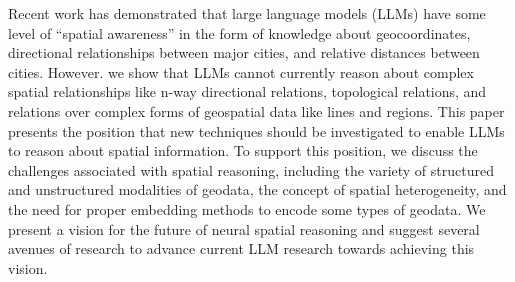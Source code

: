 
Recent work has demonstrated that large language models (LLMs) have some level of ``spatial awareness'' in the form of knowledge about geocoordinates, directional relationships between major cities, and relative distances between cities.
%
However. we show that LLMs cannot currently reason about complex spatial relationships like n-way directional relations, topological relations, and relations over complex forms of geospatial data like lines and regions.
%
This paper presents the position that new techniques should be investigated to enable LLMs to reason about spatial information.
%
To support this position, we discuss the challenges associated with spatial reasoning, including the variety of structured and unstructured modalities of geodata, the concept of spatial heterogeneity, and the need for proper embedding methods to encode some types of geodata.
%
We present a vision for the future of neural spatial reasoning and suggest several avenues of research to advance current LLM research towards achieving this vision.